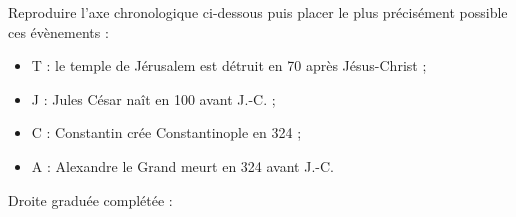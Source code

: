\begin{exercice}
    Reproduire l'axe chronologique ci-dessous puis placer le plus précisément possible ces évènements : \\ [2mm]
    \begin{itemize}
       \item T : le temple de Jérusalem est détruit en 70 après Jésus-Christ ;
       \item J : Jules César naît en 100 avant J.-C. ;
       \item C : Constantin crée Constantinople en 324 ;
       \item A : Alexandre le Grand meurt en 324 avant J.-C.
    \end{itemize}
 \end{exercice}
 
 \begin{corrige}
    Droite graduée complétée : \\ [2mm]
    \hspace*{-10mm} 
 \end{corrige}